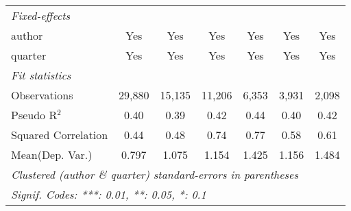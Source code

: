 \begin{tabular}{lcccccc}
   \midrule
   \emph{Fixed-effects}\\
   author                                                     & Yes            & Yes            & Yes            & Yes            & Yes            & Yes\\  
   quarter                                                    & Yes            & Yes            & Yes            & Yes            & Yes            & Yes\\  
   \midrule
   \emph{Fit statistics}\\
   Observations                                               & 29,880         & 15,135         & 11,206         & 6,353          & 3,931          & 2,098\\  
   Pseudo R$^2$                                               & 0.40           & 0.39           & 0.42           & 0.44           & 0.40           & 0.42\\  
   Squared Correlation                                        & 0.44           & 0.48           & 0.74           & 0.77           & 0.58           & 0.61\\  
Mean(Dep. Var.) & 0.797 & 1.075 & 1.154 & 1.425 & 1.156 & 1.484 \\
   \midrule \midrule
   \multicolumn{7}{l}{\emph{Clustered (author \& quarter) standard-errors in parentheses}}\\
   \multicolumn{7}{l}{\emph{Signif. Codes: ***: 0.01, **: 0.05, *: 0.1}}\\
\end{tabular}
\par\endgroup
